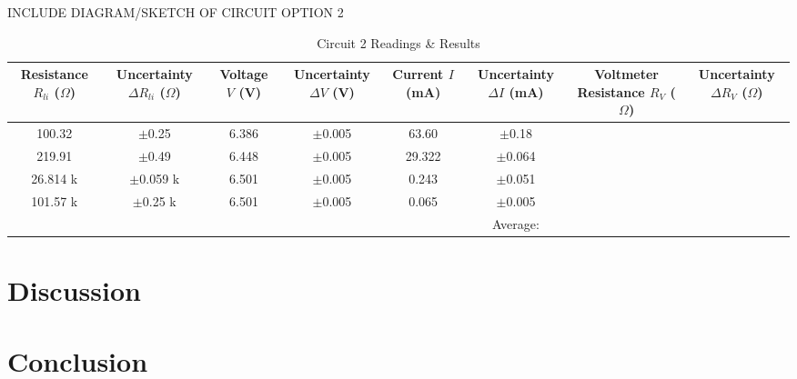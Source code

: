 \documentclass{article} %
\begin{document}
INCLUDE DIAGRAM/SKETCH OF CIRCUIT OPTION 2

\begin{table}[htbp]
\centering
\caption{Circuit 2 Readings \& Results}
\begin{tabular}{|c|c|c|c|c|c|c|c|}
\hline
\makecell{Resistance \\ $R_{li}$ ($\Omega$)} & \makecell{Uncertainty \\ $\Delta R_{li}$ ($\Omega$)} & \makecell{Voltage \\ $V$ (V)} & \makecell{Uncertainty \\ $\Delta V$ (V)} & \makecell{Current \\ $I$ (mA)} & \makecell{Uncertainty \\ $\Delta I$ (mA)} & \makecell{Voltmeter Resistance \\ $R_V$ ($\Omega$)} & \makecell{Uncertainty \\ $\Delta R_V$ ($\Omega$)} \\
\hline
100.32 & $\pm$0.25 & 6.386 & $\pm$0.005 & 63.60 & $\pm$0.18 & & \\
\hline
219.91 & $\pm$0.49 & 6.448 & $\pm$0.005 & 29.322 & $\pm$0.064 & & \\
\hline
26.814 k & $\pm$0.059 k & 6.501 & $\pm$0.005 & 0.243 & $\pm$0.051 & & \\
\hline
101.57 k & $\pm$0.25 k & 6.501 & $\pm$0.005 & 0.065 & $\pm$0.005 & & \\
\hline
\cellcolor{gray!50} & \cellcolor{gray!50} & \cellcolor{gray!50} & \cellcolor{gray!50} & \cellcolor{gray!50} & Average: &  &  \\
\hline
\end{tabular}
\end{table}


\section{Discussion}

\section{Conclusion}

\label{last_page}

\newpage
%
%
\end{document}
